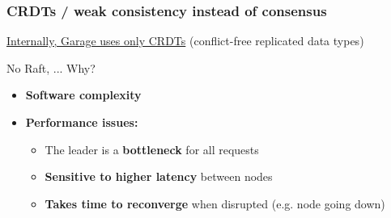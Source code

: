 \documentclass[aspectratio=169,xcolor={svgnames}]{beamer}
\begin{document}
\begin{frame}
	\frametitle{CRDTs / weak consistency instead of consensus}

	\underline{Internally, Garage uses only CRDTs} (conflict-free replicated data types)

	\vspace{2em}
	No Raft, ... Why?

	\vspace{1em}
	\begin{itemize}
		\item<2-> \textbf{Software complexity}
			\vspace{1em}
		\item<3-> \textbf{Performance issues:}
			\vspace{.5em}
			\begin{itemize}
				\item<4-> The leader is a \textbf{bottleneck} for all requests\\
					\vspace{.5em}
				\item<5-> \textbf{Sensitive to higher latency} between nodes
					\vspace{.5em}
				\item<6-> \textbf{Takes time to reconverge} when disrupted (e.g. node going down)
			\end{itemize}
	\end{itemize}
\end{frame}
\end{document}
